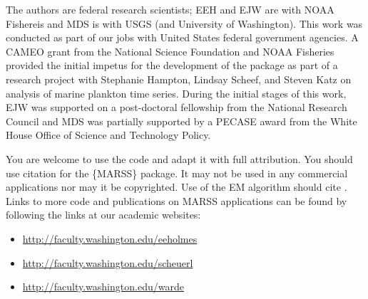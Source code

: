 The authors are federal research scientists; EEH and EJW are with NOAA Fishereis and MDS is with USGS (and University of Washington).  This work was conducted as part of our jobs with United States federal government agencies.   A CAMEO grant from the National Science Foundation and NOAA Fisheries provided the initial impetus for the development of the package as part of a research project with Stephanie Hampton, Lindsay Scheef, and Steven Katz on analysis of marine plankton time series.  During the initial stages of this work, EJW was supported on a post-doctoral fellowship from the National Research Council and MDS was partially supported by a PECASE award from the White House Office of Science and Technology Policy.

You are welcome to use the code and adapt it with full attribution.  You should use citation \citet{Holmesetal2012} for the \{MARSS\} package.  It may not be used in any commercial applications nor may it be copyrighted.  Use of the EM algorithm should cite \citet{Holmes2010}. Links to more code and publications on MARSS applications can be found by following the links at our academic websites:
\begin{itemize}
\item \url{http://faculty.washington.edu/eeholmes}
\item \url{http://faculty.washington.edu/scheuerl}
\item \url{http://faculty.washington.edu/warde}
\end{itemize}